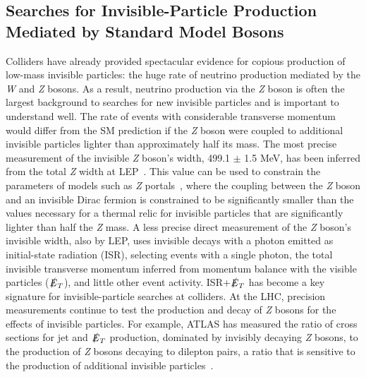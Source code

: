 \documentclass{ar-1col}
\newcommand{\IP}{invisible particle}
\newcommand{\MET}{\ensuremath{\slashed{E}_T}\xspace}
\begin{document}
\subsection{Searches for Invisible-Particle Production Mediated by Standard Model Bosons}\label{sec:results_ZHSearches}

Colliders have already provided spectacular evidence for copious production of low-mass invisible particles: the huge rate of neutrino production
mediated by the \textit{W} and \textit{Z} bosons. As a result, neutrino production via the \textit{Z}
boson is often the largest background to searches for new {\IP}s
and is important to understand well. The rate of events with considerable transverse momentum would differ from
the SM prediction if the \textit{Z} boson were coupled to additional {\IP}s
lighter than approximately half its mass. The most precise measurement of
the invisible \textit{Z} boson's width, 499.1 $\pm$ 1.5 MeV, has been inferred from
the total  \textit{Z}
width at LEP~\cite{ALEPH:2005ab}. This value can be used to
constrain the parameters of models such as \textit{Z}
portals~\cite{Carena:2003aj,Escudero:2016gzx}, where the coupling
between the \textit{Z} boson and an invisible Dirac fermion is constrained to be
significantly smaller than the values necessary for a thermal relic for {\IP}s that are significantly lighter than
half the \textit{Z} mass. A less precise direct measurement of the \textit{Z} boson's
invisible width, also by LEP, uses invisible decays with a photon
emitted as initial-state radiation (ISR), selecting events with a
single photon, the total invisible transverse momentum inferred
from momentum balance with the visible particles (\MET), and
little other event activity.  ISR+\MET has become a key
signature for invisible-particle searches at colliders. At the
LHC, precision measurements continue to test the production and
decay of \textit{Z} bosons for the effects of {\IP}s. For example, ATLAS
has measured the ratio of cross sections for jet and \MET
production, dominated by invisibly decaying \textit{Z} bosons, to
the production of \textit{Z} bosons decaying to dilepton pairs, a ratio that
is sensitive to the production of additional
{\IP}s~\cite{Aaboud:2017buf}.
\end{document}
